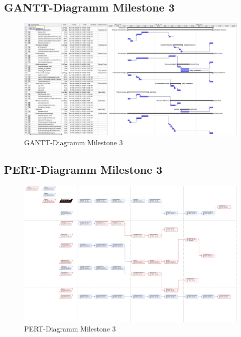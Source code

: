\subsection{GANTT-Diagramm Milestone 3}
\begin{figure}[h]
	\centering
	\includegraphics[width=1.4\linewidth, angle=90]{Grafiken/Milestone3Gantt}
	\caption{GANTT-Diagramm Milestone 3}
	\label{fig:GANTT-Diagramm Milestone 3}
\end{figure}


\subsection{PERT-Diagramm Milestone 3}
\begin{figure}[h]
	\centering
	\includegraphics[width=1.4\linewidth, angle=90]{Grafiken/Milestone3PERT}
	\caption{PERT-Diagramm Milestone 3}
	\label{fig:PERT-Diagramm Milestone 3}
\end{figure}